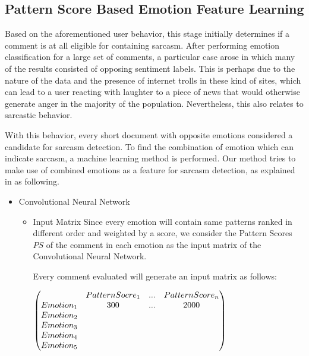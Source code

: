 \documentclass[12pt,a4paper]{report}
\theoremstyle{definition}
\begin{document}
\begin{CJK}{UTF8}{bsmi}
    \subsection{Pattern Score Based Emotion Feature Learning}
    \par Based on the aforementioned user behavior, this stage initially determines if a comment is at all eligible for containing sarcasm. After performing emotion classification for a large set of comments, a particular case arose in which many of the results consisted of opposing sentiment labels. This is perhaps due to the nature of the data and the presence of internet trolls in these kind of sites, which can lead to a user reacting with laughter to a piece of news that would otherwise generate anger in the majority of the population. Nevertheless, this also relates to sarcastic behavior.
    
    \par With this behavior, every short document with opposite emotions considered a candidate for sarcasm detection. To find the combination of emotion which can indicate sarcasm, a machine learning method is performed. Our method tries to make use of combined emotions as a feature for sarcasm detection, as explained in as following.
    
    \begin{itemize}
        \item Convolutional Neural Network
            \begin{itemize}
            \item Input Matrix
            \newline
            Since every emotion will contain same patterns ranked in different order and weighted by a score, we consider the Pattern Scores  \(PS\) of the comment in each emotion as the input matrix of the Convolutional Neural Network.
            
            Every comment evaluated will generate an input matrix as follows:
            \newline
            \begin{center}
            \begin{math}
            \begin{pmatrix} 
            & Pattern Socre_1 & ... & Pattern Score_n\\ 
            Emotion_1 & 300 & ... & 2000\\
            Emotion_2 \\
            Emotion_3 \\
            Emotion_4 \\
            Emotion_5 \\
            \end{pmatrix}
            \newline
            \end{math}
            \end{center}
            

\end{itemize}
\end{itemize}
\end{CJK}
\end{document}
